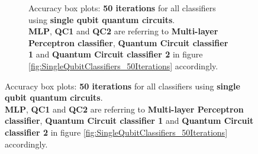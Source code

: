 \begin{figure}[h!]
\begin{subfigure}{1.0\textwidth}
\begin{subfigure}{1.0\textwidth}
{            }
        \end{subfigure}
        \begin{subfigure}{1.0\textwidth}
            \centering
        \end{subfigure}
        \begin{subfigure}{1.0\textwidth}
            \centering
        \end{subfigure}
        \caption{Accuracy box plots: \textbf{50 iterations} for all classifiers using \textbf{single qubit quantum circuits}.\\ \textbf{MLP}, \textbf{QC1} and \textbf{QC2} are referring to \textbf{Multi-layer Perceptron classifier}, \textbf{Quantum Circuit classifier 1} and \textbf{Quantum Circuit classifier 2} in figure \ref{fig:SingleQubitClassifiers_50Iterations} accordingly.}
        \label{fig:SingleQubitClassifiers_50Iterations_boxplot}
    \end{subfigure}
\end{figure}


